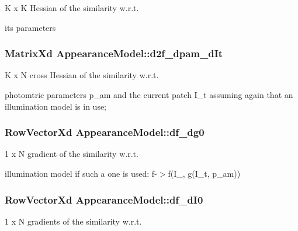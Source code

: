 K x K Hessian of the similarity w.\-r.\-t. 

its parameters \hypertarget{classAppearanceModel_a05e7fd0e06e95cc1b3baeca2f5b061c7}{
\subsubsection[{d2f\-\_\-dpam\-\_\-d\-It}]{\setlength{\rightskip}{0pt plus 5cm}Matrix\-Xd Appearance\-Model\-::d2f\-\_\-dpam\-\_\-d\-It\hspace{0.3cm}{\ttfamily [protected]}}}\label{classAppearanceModel_a05e7fd0e06e95cc1b3baeca2f5b061c7}


K x N cross Hessian of the similarity w.\-r.\-t. 

photomtric parameters p\-\_\-am and the current patch I\-\_\-t assuming again that an illumination model is in use; \hypertarget{classAppearanceModel_a155e9a776cfb1460c569e34ae05a3774}{
\subsubsection[{df\-\_\-dg0}]{\setlength{\rightskip}{0pt plus 5cm}Row\-Vector\-Xd Appearance\-Model\-::df\-\_\-dg0\hspace{0.3cm}{\ttfamily [protected]}}}\label{classAppearanceModel_a155e9a776cfb1460c569e34ae05a3774}


1 x N gradient of the similarity w.\-r.\-t. 

illumination model if such a one is used\-: f-\/$>$f(\-I\-\_, g(\-I\-\_\-t, p\-\_\-am)) \hypertarget{classAppearanceModel_a6434cfd26c953bd685e25ebf10ccc6ec}{
\subsubsection[{df\-\_\-d\-I0}]{\setlength{\rightskip}{0pt plus 5cm}Row\-Vector\-Xd Appearance\-Model\-::df\-\_\-d\-I0\hspace{0.3cm}{\ttfamily [protected]}}}\label{classAppearanceModel_a6434cfd26c953bd685e25ebf10ccc6ec}


1 x N gradients of the similarity w.\-r.\-t. 

